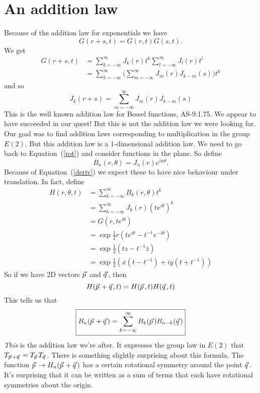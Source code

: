 \documentclass{article}
\newcommand\myvec[1]{\vec{#1}\hspace{0.5mm}}
\begin{document}
\section{An addition law}
Because of the addition law for exponentials we have
\[
G(r+s,t) = G(r,t)G(s,t).
\]
We get
\begin{align*}
G(r+s,t) &= \sum_{k=-\infty}^\infty J_k(r)t^k\sum_{l=-\infty}^\infty J_l(r)t^l\\
&= \sum_{k=-\infty}^\infty \Big(\sum_{m=-\infty}^\infty J_{m}(r)J_{k-m}(s) \Big) t^k
\end{align*}
and so
\[
J_k(r+s) = \sum_{m=-\infty}^\infty J_{m}(r)J_{k-m}(s)
\]
This is the well known addition law for Bessel functions, AS-9.1.75.
We appear to have succeeded in our quest!
But this is not the addition law we were looking for.
Our goal was to find addition laws corresponding to multiplication in the group $E(2)$.
But this addition law is a 1-dimensional addition law.
We need to go back to Equation~(\ref{rot}) and consider functions in the plane.
So define
\[
\boxed{B_n(r,\theta) = J_n(r)e^{in\theta}}.
\]
Because of Equation~(\ref{deriv}) we expect these to have nice behaviour under translation.
In fact, define
\begin{align*}
H(r,\theta,t) &= \sum_{k=-\infty}^\infty B_k(r,\theta)t^k \\
&= \sum_{k=-\infty}^\infty J_k(r)(te^{i\theta})^k \\
&= G(r,te^{i\theta}) \\
&= \exp\frac{1}{2}r(te^{i\theta}-t^{-1}e^{-i\theta}) \\
&= \exp\frac{1}{2}(tz-t^{-1}\bar{z}) \\
&= \exp\frac{1}{2}(x(t-t^{-1})+iy(t+t^{-1}))
\end{align*}
So if we have 2D vectors $\myvec{p}$ and $\myvec{q}$, then
\[
H(\myvec{p}+\myvec{q},t) = H(\myvec{p},t)H(\myvec{q},t)
\]
This tells us that
\begin{equation}
\boxed{B_n(\myvec{p}+\myvec{q}) = \sum_{k=-\infty}^\infty B_k(\myvec{p})B_{n-k}(\myvec{q})}\label{addition}
\end{equation}
\textit{This} is the addition law we're after.
It expresses the group law in $E(2)$ that $T_{\myvec{p}+\myvec{q}}=T_{\myvec{p}}T_{\myvec{q}}$.
There is something slightly surprising about this formula.
The function $\myvec{p}\rightarrow H_n(\myvec{p}+\myvec{q})$ has a certain rotational symmetry around the point $\myvec{q}$.
It's surprising that it can be written as a sum of terms that each have rotational symmetries about the origin.
\end{document}
